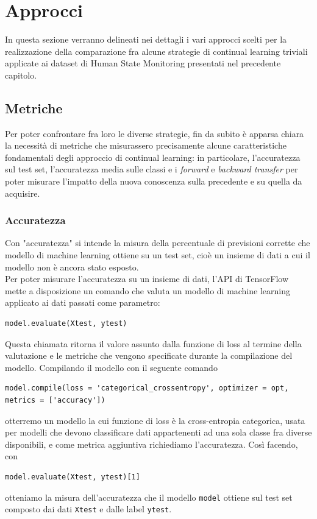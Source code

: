 \chapter{Approcci}
In questa sezione verranno delineati nei dettagli i vari approcci scelti per la realizzazione della comparazione fra alcune strategie di continual learning triviali applicate ai dataset di Human State Monitoring presentati nel precedente capitolo.

\section{Metriche}
Per poter confrontare fra loro le diverse strategie, fin da subito è apparsa chiara la necessità di metriche che misurassero precisamente alcune caratteristiche fondamentali degli approccio di continual learning: in particolare, l'accuratezza sul test set, l'accuratezza media sulle classi e i \textit{forward} e \textit{backward transfer} per poter misurare l'impatto della nuova conoscenza sulla precedente e su quella da acquisire.
\subsection{Accuratezza}
Con "accuratezza" si intende la misura della percentuale di previsioni corrette che modello di machine learning ottiene su un test set, cioè un insieme di dati a cui il modello non è ancora stato esposto.\\
Per poter misurare l'accuratezza su un insieme di dati, l'API di TensorFlow mette a disposizione un comando che valuta un modello di machine learning applicato ai dati passati come parametro:
\begin{lstlisting}[style = myPython]
model.evaluate(Xtest, ytest)
\end{lstlisting}
Questa chiamata ritorna il valore assunto dalla funzione di loss al termine della valutazione e le metriche che vengono specificate durante la compilazione del modello. Compilando il modello con il seguente comando
\begin{lstlisting}[style = myPython]
model.compile(loss = 'categorical_crossentropy', optimizer = opt, metrics = ['accuracy'])
\end{lstlisting}
otterremo un modello la cui funzione di loss è la cross-entropia categorica, usata per modelli che devono classificare dati appartenenti ad una sola classe fra diverse disponibili, e come metrica aggiuntiva richiediamo l'accuratezza. Così facendo, con
\begin{lstlisting}[style = myPython]
model.evaluate(Xtest, ytest)[1]
\end{lstlisting}
otteniamo la misura dell'accuratezza che il modello \texttt{model} ottiene sul test set composto dai dati \texttt{Xtest} e dalle label \texttt{ytest}.
